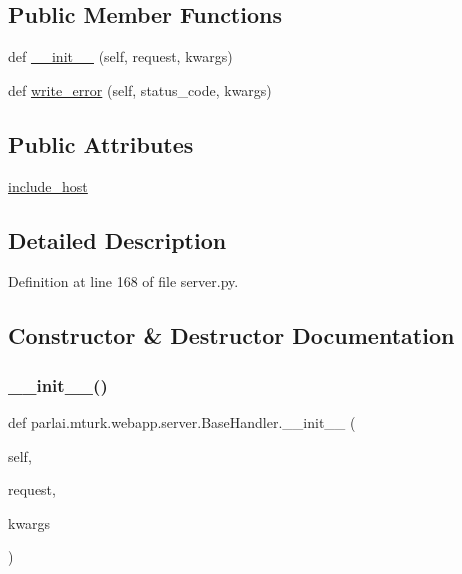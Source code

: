 \subsection*{Public Member Functions}
\begin{DoxyCompactItemize}
\item 
def \hyperlink{classparlai_1_1mturk_1_1webapp_1_1server_1_1BaseHandler_aa09a199cc63b8a1294fdbd98688d8b09}{\+\_\+\+\_\+init\+\_\+\+\_\+} (self, request, kwargs)
\item 
def \hyperlink{classparlai_1_1mturk_1_1webapp_1_1server_1_1BaseHandler_a5598d255e3912452fbfcab561819840e}{write\+\_\+error} (self, status\+\_\+code, kwargs)
\end{DoxyCompactItemize}
\subsection*{Public Attributes}
\begin{DoxyCompactItemize}
\item 
\hyperlink{classparlai_1_1mturk_1_1webapp_1_1server_1_1BaseHandler_a757114ed91180c7263e809175993ad07}{include\+\_\+host}
\end{DoxyCompactItemize}


\subsection{Detailed Description}


Definition at line 168 of file server.\+py.



\subsection{Constructor \& Destructor Documentation}
\mbox{\label{classparlai_1_1mturk_1_1webapp_1_1server_1_1BaseHandler_aa09a199cc63b8a1294fdbd98688d8b09}} 
\subsubsection{\texorpdfstring{\+\_\+\+\_\+init\+\_\+\+\_\+()}{\_\_init\_\_()}}
{\footnotesize\ttfamily def parlai.\+mturk.\+webapp.\+server.\+Base\+Handler.\+\_\+\+\_\+init\+\_\+\+\_\+ (\begin{DoxyParamCaption}\item[{}]{self,  }\item[{}]{request,  }\item[{}]{kwargs }\end{DoxyParamCaption})}



